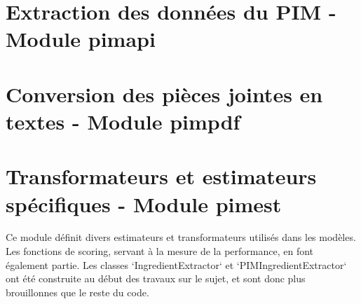\documentclass{report}
\begin{document}
    \section{Extraction des données du PIM - Module pimapi}
    \label{code:pimapi}
    \begin{multicols}{2}
    \begin{spacing}{1.0}
    \end{spacing}
    \end{multicols}

    \section{Conversion des pièces jointes en textes - Module pimpdf}
    \label{code:pimpdf}
    \begin{multicols}{2}
    \begin{spacing}{1.0}
    \end{spacing}
    \end{multicols}
    
    \section{Transformateurs et estimateurs spécifiques - Module pimest}
    \label{code:pimest}

    Ce module définit divers estimateurs et transformateurs utilisés dans les modèles.
    Les fonctions de scoring, servant à la mesure de la performance, en font également partie.
    Les classes `IngredientExtractor` et `PIMIngredientExtractor` ont été construite au début des travaux sur le sujet, et sont donc plus \og brouillonnes \fg que le reste du code.
    
    \begin{multicols}{2}
    \begin{spacing}{1.0}
    \end{spacing}
    \end{multicols}
\end{document}
